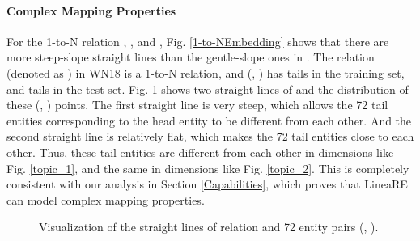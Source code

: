 \documentclass[conference]{IEEEtran}
\begin{document}
\paragraph{Complex Mapping Properties}
For the 1-to-N relation , , and , Fig. \ref{1-to-NEmbedding} shows that there are more steep-slope straight lines than the gentle-slope ones in . The relation  (denoted as ) in WN18 is a 1-to-N relation, and (, ) has  tails in the training set, and  tails in the test set. Fig. \ref{TopicLine} shows two straight lines of  and the distribution of these (, ) points. The first straight line is very steep, which allows the 72 tail entities corresponding to the head entity  to be different from each other. And the second straight line is relatively flat, which makes the 72 tail entities close to each other. Thus, these tail entities are different from each other in dimensions like Fig. \ref{topic_1}, and the same in dimensions like Fig. \ref{topic_2}. This is completely consistent with our analysis in Section \ref{Capabilities}, which proves that LineaRE can model complex mapping properties.
\begin{figure}[t]
	\centering
	\caption{
		Visualization of the straight lines of relation  and 72 entity pairs (, ).
	}
	\label{TopicLine}
\end{figure}
\end{document}
